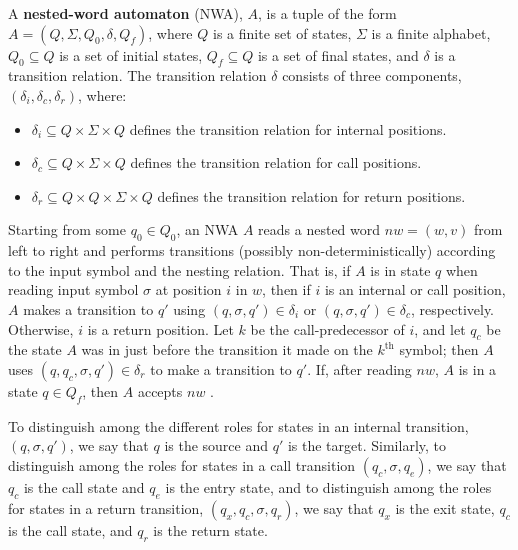 \documentclass{llncs}
\begin{document}
\begin{definition}
\label{De:NWA}
A \textbf{nested-word automaton} (NWA), $A$, is a tuple of the form $A=(Q, \Sigma, Q_0, \delta, Q_f)$, where $Q$ is a finite set of states, $\Sigma$ is a finite alphabet, $Q_0 \subseteq Q$ is a set of initial states, $Q_f \subseteq Q$ is a set of final states, and $\delta$ is a transition relation. The transition relation $\delta$ consists of three components, $(\delta_i, \delta_c, \delta_r)$, where:
\begin{itemize}
    \item
    $\delta_i \subseteq Q \times \Sigma \times Q$ defines the transition
    relation for internal positions.
    
    \item
    $\delta_c \subseteq Q \times \Sigma \times Q$ defines the transition
    relation for call positions.
    
    \item
    $\delta_r \subseteq Q \times Q \times \Sigma \times Q$ defines the
    transition relation for return positions.
    
\end{itemize}
\end{definition}

Starting from some $q_0 \in Q_0$, an NWA $A$ reads a nested word $nw = (w,v)$ from left to right and performs transitions (possibly non-deterministically) according to the input symbol and the nesting relation. That is, if $A$ is in state $q$ when reading input symbol $\sigma$ at position $i$ in $w$, then if $i$ is an internal or call position, $A$ makes a transition to $q'$ using $(q,\sigma,q') \in \delta_i$ or $(q,\sigma,q') \in \delta_c$, respectively. Otherwise, $i$ is a return position. Let $k$ be the call-predecessor of $i$, and let $q_c$ be the state $A$ was in just before the transition it made on the $k^{\text{th}}$ symbol; then $A$ uses $(q,q_c,\sigma,q') \in \delta_r$ to make a transition to $q'$.  If, after reading $nw$, $A$ is in a state $q \in Q_f$, then $A$ accepts $nw$ \cite{DLT:AM2006}.  

To distinguish among the different roles for states in an internal transition, $(q,\sigma,q')$, we say that $q$ is the source and $q'$ is the target.  Similarly, to distinguish among the roles for states in a call transition $(q_c,\sigma,q_e)$, we say that $q_c$ is the call state and $q_e$ is the entry state, and to distinguish among the roles for states in a return transition, $(q_x,q_c,\sigma,q_r)$, we say that $q_x$ is the exit state, $q_c$ is the call state, and $q_r$ is the return state.
\end{document}
